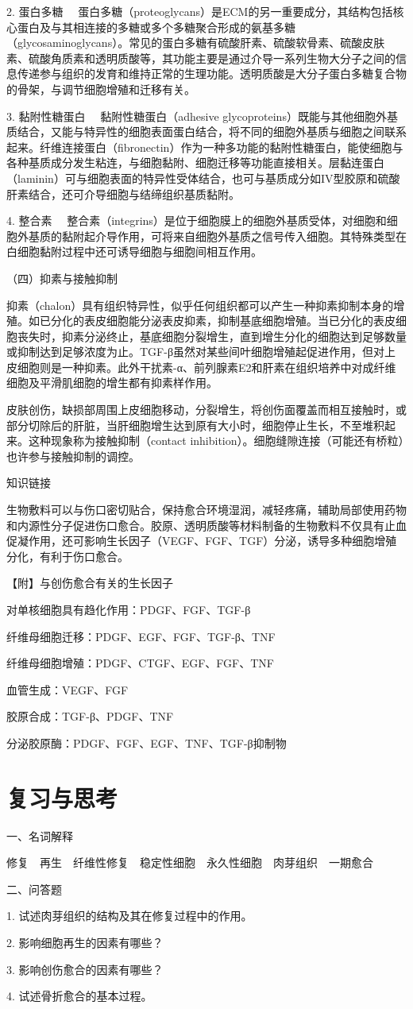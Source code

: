 {2. 蛋白多糖}
　蛋白多糖（proteoglycans）是ECM的另一重要成分，其结构包括核心蛋白及与其相连接的多糖或多个多糖聚合形成的氨基多糖（glycosaminoglycans）。常见的蛋白多糖有硫酸肝素、硫酸软骨素、硫酸皮肤素、硫酸角质素和透明质酸等，其功能主要是通过介导一系列生物大分子之间的信息传递参与组织的发育和维持正常的生理功能。透明质酸是大分子蛋白多糖复合物的骨架，与调节细胞增殖和迁移有关。

{3. 黏附性糖蛋白} 　黏附性糖蛋白（adhesive
glycoproteins）既能与其他细胞外基质结合，又能与特异性的细胞表面蛋白结合，将不同的细胞外基质与细胞之间联系起来。纤维连接蛋白（fibronectin）作为一种多功能的黏附性糖蛋白，能使细胞与各种基质成分发生粘连，与细胞黏附、细胞迁移等功能直接相关。层黏连蛋白（laminin）可与细胞表面的特异性受体结合，也可与基质成分如IV型胶原和硫酸肝素结合，还可介导细胞与结缔组织基质黏附。

{4. 整合素}
　整合素（integrins）是位于细胞膜上的细胞外基质受体，对细胞和细胞外基质的黏附起介导作用，可将来自细胞外基质之信号传入细胞。其特殊类型在白细胞黏附过程中还可诱导细胞与细胞间相互作用。

{（四）抑素与接触抑制}

抑素（chalon）具有组织特异性，似乎任何组织都可以产生一种抑素抑制本身的增殖。如已分化的表皮细胞能分泌表皮抑素，抑制基底细胞增殖。当已分化的表皮细胞丧失时，抑素分泌终止，基底细胞分裂增生，直到增生分化的细胞达到足够数量或抑制达到足够浓度为止。TGF-β虽然对某些间叶细胞增殖起促进作用，但对上皮细胞则是一种抑素。此外干扰素-α、前列腺素E2和肝素在组织培养中对成纤维细胞及平滑肌细胞的增生都有抑素样作用。

皮肤创伤，缺损部周围上皮细胞移动，分裂增生，将创伤面覆盖而相互接触时，或部分切除后的肝脏，当肝细胞增生达到原有大小时，细胞停止生长，不至堆积起来。这种现象称为接触抑制（contact
inhibition）。细胞缝隙连接（可能还有桥粒）也许参与接触抑制的调控。

{知识链接}

生物敷料可以与伤口密切贴合，保持愈合环境湿润，减轻疼痛，辅助局部使用药物和内源性分子促进伤口愈合。胶原、透明质酸等材料制备的生物敷料不仅具有止血促凝作用，还可影响生长因子（VEGF、FGF、TGF）分泌，诱导多种细胞增殖分化，有利于伤口愈合。

{【附】与创伤愈合有关的生长因子}

对单核细胞具有趋化作用：PDGF、FGF、TGF-β

纤维母细胞迁移：PDGF、EGF、FGF、TGF-β、TNF

纤维母细胞增殖：PDGF、CTGF、EGF、FGF、TNF

血管生成：VEGF、FGF

胶原合成：TGF-β、PDGF、TNF

分泌胶原酶：PDGF、FGF、EGF、TNF、TGF-β抑制物

\section*{复习与思考}

{一、名词解释}

修复　再生　纤维性修复　稳定性细胞　永久性细胞　肉芽组织　一期愈合

{二、问答题}

1. 试述肉芽组织的结构及其在修复过程中的作用。

2. 影响细胞再生的因素有哪些？

3. 影响创伤愈合的因素有哪些？

4. 试述骨折愈合的基本过程。
